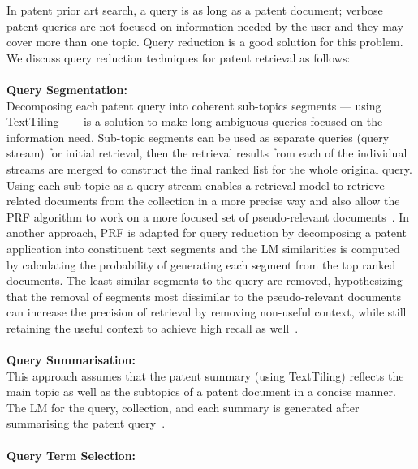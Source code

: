 In patent prior art search, a query is as long as a patent document; verbose patent queries are not focused on information needed by the user and they may cover more than one topic. Query reduction is a good solution for this problem. We discuss query reduction techniques for patent retrieval as follows:
\\\\
\textbf{Query Segmentation:} 
\ \\
Decomposing each patent query into coherent sub-topics segments --- using TextTiling~\citep{hearst1997texttiling} --- is a solution to make long ambiguous queries focused on the information need. Sub-topic segments can be used as separate queries (query stream) for initial retrieval, then the retrieval results from each of the individual streams are merged to construct the final ranked list for the whole original query. Using each sub-topic as a query stream enables a retrieval model to retrieve related documents from the collection in a more precise way and also allow the PRF algorithm to work on a more focused set of pseudo-relevant documents~\citep{takaki2004associative, ganguly2011united}. In another approach, PRF is adapted for query reduction by decomposing a patent application into constituent text segments and the LM similarities is computed by calculating the probability of generating each segment from the top ranked documents. The least similar segments to the query are removed, hypothesizing that the removal of segments most dissimilar to the pseudo-relevant documents can increase the precision of retrieval by removing non-useful context, while still retaining the useful context to achieve high recall as well~\citep{ganguly2011patent}.
\\\\
\textbf{Query Summarisation:} 
\ \\
This approach assumes that the patent summary (using TextTiling) reflects the main topic as well as the subtopics of a patent document in a concise manner. The LM for the query, collection, and each summary is generated after summarising the patent query~\citep{mahdabi2011report}. 
\\\\
\textbf{Query Term Selection:}
\ \\

